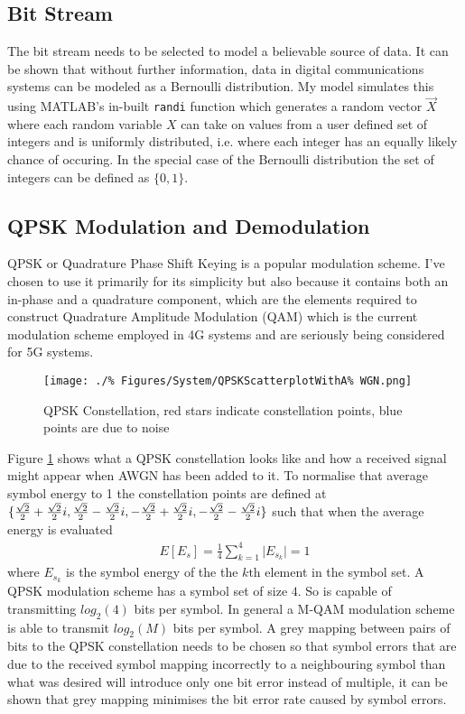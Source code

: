 \subsection{Bit Stream}
The bit stream needs to be selected to model %
a believable source of data. It can be shown %
that without further information, data %
in digital communications systems can be %
modeled as a Bernoulli distribution. %
My model simulates this using MATLAB's in-built %
\texttt{randi} function which generates %
a random vector $\vec{X}$ where each %
random variable $X$ can take on values from %
a user defined set of integers and is %
uniformly distributed, i.e. where each integer %
has an equally likely chance of occuring. In %
the special case of the Bernoulli distribution %
the set of integers can be defined as $\{0,1\}$.

\subsection{QPSK Modulation and Demodulation}
\FloatBarrier
QPSK or Quadrature Phase Shift Keying is a popular %
modulation scheme. I've chosen to use it primarily %
for its simplicity but also because it contains both
an in-phase and a quadrature component, which are %
the elements required to construct %
Quadrature Amplitude Modulation (QAM) %
which is the current modulation scheme employed %
in 4G systems %
and are seriously being considered for 5G systems.
\begin{figure}[ht]
	\centering
	\texttt{[image: ./\%
	Figures/System/QPSKScatterplotWithA\%
	WGN.png]}
	\caption{QPSK Constellation, red stars %
	indicate constellation points, blue %
	points are due to noise}
	\label{fig:QPSKConstellation}
\end{figure}

Figure \ref{fig:QPSKConstellation} shows what %
a QPSK constellation looks like and how a %
received signal might appear when AWGN has %
been added to it. To normalise that average %
symbol energy to 1 the constellation points %
are defined at $\{\frac{\sqrt{2}}{2} + \frac{%
\sqrt{2}}{2}i, \frac{\sqrt{2}}{2} - %
\frac{\sqrt{2}}{2}i, -\frac{\sqrt{2}%
}{2} + \frac{\sqrt{2}}{2}i, %
-\frac{\sqrt{2}}{2} - \frac{\sqrt{2}%
}{2}i\}$ such that when the average %
energy is evaluated
\begin{align}
	E\left[E_s\right] = \frac{1}{4} \sum_{k=1}^{4} %
	\lvert E_{s_{k}} \rvert = 1
\end{align}
where $E_{s_{k}}$ is the symbol energy of the the %
$k\text{th}$ element in the symbol set. A QPSK %
modulation scheme has a symbol set of size $4$. %
So is capable of transmitting $log_{2}(4)$ bits %
per symbol. In general a M-QAM modulation scheme %
is able to transmit $log_{2}(M)$ bits per symbol. %
A grey mapping between pairs of bits to the QPSK %
constellation needs to be chosen so that symbol %
errors that are due to the received symbol mapping %
incorrectly to a neighbouring symbol than what was %
desired will introduce only one bit error instead %
of multiple, it can be shown that grey mapping %
minimises the bit error rate caused by %
symbol errors. %

